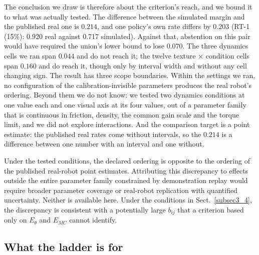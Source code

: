 \documentclass[pdflatex,iicol,sn-apa]{sn-jnl}
\theoremstyle{remark}
\begin{document}
The conclusion we draw is therefore about the criterion's reach, and we bound it to what was
actually tested. The difference between the simulated margin and the published real one is $0.214$,
and one policy's own rate differs by $0.203$ (RT-1 (15\%): 0.920 real against 0.717
simulated). Against that, abstention on this pair would have required the union's lower bound to
lose $0.070$. The three dynamics cells we ran span $0.044$ and do not reach it; the twelve
texture $\times$ condition cells span $0.160$ and do reach it, though only by interval width and
without any cell changing sign. The result has three scope boundaries. Within the settings
we ran, no configuration of the calibration-invisible parameters produces the real robot's
ordering. Beyond them we do not know: we tested two dynamics conditions at one value each and
one visual axis at its four values, out of a parameter family that is continuous in friction,
density, the common gain scale and the torque limit, and we did not explore interactions. And the
comparison target is a point estimate: the published real rates come without intervals, so the
$0.214$ is a difference between one number with an interval and one without.

Under the tested conditions, the declared ordering is opposite to the ordering of the
published real-robot point estimates. Attributing this discrepancy to effects outside the
entire parameter family constrained by demonstration replay would require broader parameter
coverage or real-robot replication with quantified uncertainty. Neither is available here.
Under the conditions in Sect.~\ref{subsec3_4}, the discrepancy is consistent with a potentially
large $b_{ij}$ that a criterion based only on $E_\theta$ and $E_{MC}$ cannot identify.

\subsection{What the ladder is for}\label{subsec8_5}
\end{document}
